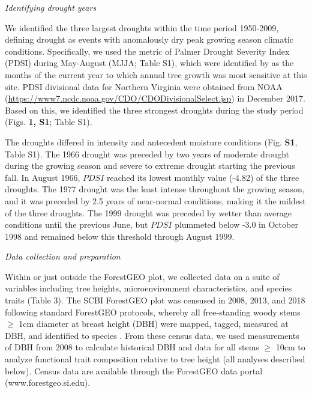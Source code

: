 \documentclass[
]{article}
\begin{document}
\emph{Identifying drought years}

We identified the three largest droughts within the time period
1950-2009, defining drought \citep{slette_how_2019} as events with
anomalously dry peak growing season climatic conditions. Specifically,
we used the metric of Palmer Drought Severity Index (PDSI) during
May-August (MJJA; Table S1), which were identified by
\citet{helcoski_growing_2019} as the months of the current year to which
annual tree growth was most sensitive at this site. PDSI divisional data
for Northern Virginia were obtained from NOAA
(\url{https://www7.ncdc.noaa.gov/CDO/CDODivisionalSelect.jsp}) in
December 2017. Based on this, we identified the three strongest droughts
during the study period (Figs. \textbf{1, S1}; Table S1).

The droughts differed in intensity and antecedent moisture conditions
(Fig. \textbf{S1}, Table S1). The 1966 drought was preceded by two years
of moderate drought during the growing season and severe to extreme
drought starting the previous fall. In August 1966, \(PDSI\) reached its
lowest monthly value (-4.82) of the three droughts. The 1977 drought was
the least intense throughout the growing season, and it was preceded by
2.5 years of near-normal conditions, making it the mildest of the three
droughts. The 1999 drought was preceded by wetter than average
conditions until the previous June, but \(PDSI\) plummeted below -3.0 in
October 1998 and remained below this threshold through August 1999.

\emph{Data collection and preparation}

Within or just outside the ForestGEO plot, we collected data on a suite
of variables including tree heights, microenvironment characteristics,
and species traits (Table 3). The SCBI ForestGEO plot was censused in
2008, 2013, and 2018 following standard ForestGEO protocols, whereby all
free-standing woody stems \(\ge\) 1cm diameter at breast height (DBH)
were mapped, tagged, measured at DBH, and identified to species
\citep{condit_tropical_1998}. From these census data, we used
measurements of DBH from 2008 to calculate historical DBH and data for
all stems \(\ge\) 10cm to analyze functional trait composition relative
to tree height (all analyses described below). Census data are available
through the ForestGEO data portal (www.forestgeo.si.edu).
\end{document}
